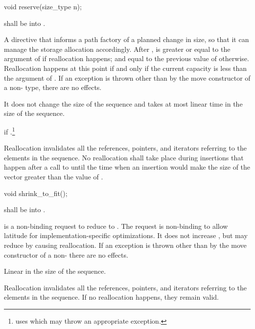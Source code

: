 \begin{itemdecl}
	void reserve(size_type n);
\end{itemdecl}
\begin{itemdescr}
	\pnum
	\requires
	 shall be  into .
	
	\pnum
	\effects
	A directive that informs a path factory of a planned change in size, so that it can manage the storage
	allocation accordingly. After ,  is greater or equal to the argument of  if
	reallocation happens; and equal to the previous value of  otherwise. Reallocation happens
	at this point if and only if the current capacity is less than the argument of . If an exception
	is thrown other than by the move constructor of a non- type, there are no effects.
	
	\pnum
	\complexity
	It does not change the size of the sequence and takes at most linear time in the size of the
	sequence.
	
	\pnum
	\throws
	 if .\footnote{ uses  which
	may throw an appropriate exception.}

	\pnum
	\remarks
	Reallocation invalidates all the references, pointers, and iterators
	referring to the elements in the sequence.
	No reallocation shall take place during insertions that happen
	after a call to
	until the time when an insertion would make the size of the vector
	greater than the value of
	.
\end{itemdescr}

\begin{itemdecl}
	void shrink_to_fit();
\end{itemdecl}
\begin{itemdescr}
	\pnum
	\requires
	 shall be  into .
	
	\pnum
	\effects
	 is a non-binding request to reduce
	 to .
	\enternote
	The request is non-binding to allow latitude for
	implementation-specific optimizations.
	\exitnote
	It does not increase , but may reduce 
	by causing reallocation. 
	If an exception is thrown other than by the move constructor
	of a non-  there are no effects.

	\pnum
	\complexity Linear in the size of the sequence.

	\pnum
	\remarks Reallocation invalidates all the references, pointers, and 
	iterators referring to the elements in the sequence. If no reallocation 
	happens, they remain valid.
\end{itemdescr}

